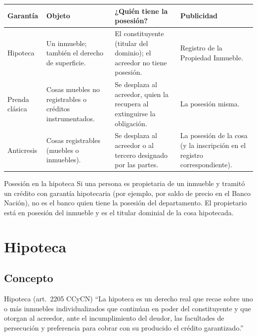 \documentclass[12pt,oneside]{book}
\begin{document}
\begin{table}[H]
\centering
\begin{tabularx}{\textwidth}{@{}>{\raggedright\arraybackslash}p{}>{\raggedright\arraybackslash}X>{\raggedright\arraybackslash}X>{\raggedright\arraybackslash}p{}@{}}
\toprule
\textbf{Garantía} & \textbf{Objeto} & \textbf{¿Quién tiene la posesión?} & \textbf{Publicidad} \\
\midrule
Hipoteca & Un inmueble; también el derecho de superficie. & El constituyente (titular del dominio); el acreedor no tiene posesión. & Registro de la Propiedad Inmueble. \\
Prenda clásica & Cosas muebles no registrables o créditos instrumentados. & Se desplaza al acreedor, quien la recupera al extinguirse la obligación. & La posesión misma. \\
Anticresis & Cosas registrables (muebles o inmuebles). & Se desplaza al acreedor o al tercero designado por las partes. & La posesión de la cosa (y la inscripción en el registro correspondiente). \\
\bottomrule
\end{tabularx}
\end{table}

\begin{example}{Posesión en la hipoteca}
Si una persona es propietaria de un inmueble y tramitó un crédito con garantía hipotecaria (por ejemplo, por saldo de precio en el Banco Nación), no es el banco quien tiene la posesión del departamento. El propietario está en posesión del inmueble y es el titular dominial de la cosa hipotecada.
\end{example}

\section{Hipoteca}

\subsection{Concepto}

\begin{definition}{Hipoteca (art.~2205 CCyCN)}
``La hipoteca es un derecho real que recae sobre uno o más inmuebles individualizados que continúan en poder del constituyente y que otorgan al acreedor, ante el incumplimiento del deudor, las facultades de persecución y preferencia para cobrar con su producido el crédito garantizado.''
\end{definition}
\end{document}
